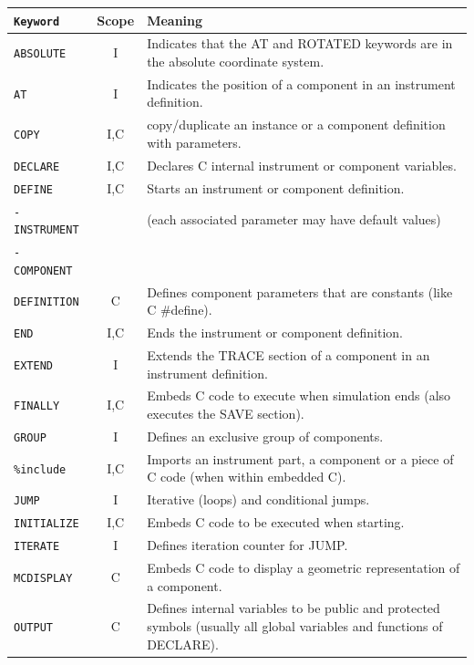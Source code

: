 \begin{table}
  \begin{center}
    {\let\my=\\
    \begin{tabular}{|l|c|p{}|}
      \hline
      \texttt{Keyword} & Scope & Meaning \\
      \hline
      \texttt{ABSOLUTE} & I & Indicates that the AT and ROTATED keywords are in the absolute coordinate system. \\
      \texttt{AT} & I & Indicates the position of a component in an instrument definition. \\
      \texttt{COPY}& I,C & copy/duplicate an instance or a component definition with parameters. \\
      \texttt{DECLARE} & I,C & Declares C internal instrument or component variables. \\
      \texttt{DEFINE} & I,C & Starts an instrument or component definition. \\
      \texttt{- INSTRUMENT} & & (each associated parameter may have default values) \\
      \texttt{- COMPONENT} & & \\
      \texttt{DEFINITION} & C & Defines component parameters that are constants (like C \#define). \\
      \texttt{END} & I,C & Ends the instrument or component definition. \\
      \texttt{EXTEND} & I & Extends the TRACE section of a component in an instrument definition. \\
      \texttt{FINALLY} & I,C & Embeds C code to execute when simulation ends (also executes the SAVE section). \\
      \texttt{GROUP} & I & Defines an exclusive group of components. \\
      \texttt{\%include} & I,C & Imports an instrument part, a component or a piece of C code (when within embedded C). \\
      \texttt{JUMP} & I & Iterative (loops) and conditional jumps. \\
      \texttt{INITIALIZE} & I,C & Embeds C code to be executed when starting. \\
      \texttt{ITERATE} & I & Defines iteration counter for JUMP. \\
      \texttt{MCDISPLAY} & C & Embeds C code to display a geometric  representation of a component. \\
      \texttt{OUTPUT} & C & Defines internal variables to be public and protected symbols (usually all global variables and functions of DECLARE).\\

\end{tabular}}
\end{center}
\end{table}

